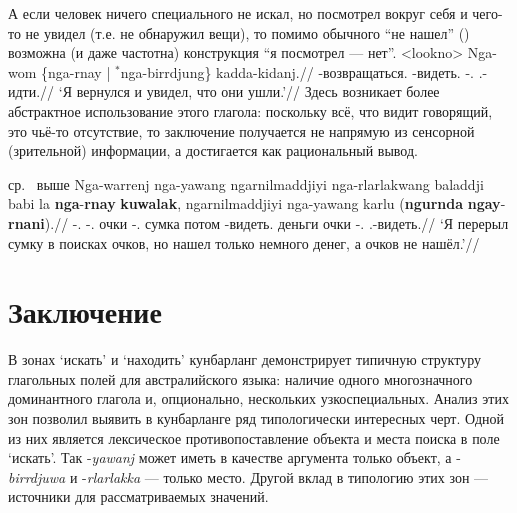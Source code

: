А если человек ничего специального не искал, но посмотрел вокруг себя и чего-то не увидел (т.е. не обнаружил вещи), то помимо обычного ``не нашел'' () возможна (и даже частотна) конструкция ``я посмотрел --- нет''. %
\ex<lookno>\begingl
\gla Nga-wom \{{nga-rnay |} $^*$nga-birrdjung\} kadda-kidanj.//
\glb \nga-возвращаться.\Pst{} \phantom{\{}\nga-видеть.\Pst{} \phantom{$^*$}\nga-\bdj.\Pst{} \Tpl.\Real-идти.\Pst{}//
\glft `Я вернулся и увидел, что они ушли.'//%
\endgl\xe
Здесь возникает более абстрактное использование этого глагола: поскольку всё, что видит говорящий, это чьё-то отсутствие, то заключение получается не напрямую из сенсорной (зрительной) информации, а достигается как рациональный вывод.


ср.\  выше
\begingl
\gla Nga-warrenj nga-yawang ngarnilmaddjiyi nga-rlarlakwang baladdji babi la \textbf{nga}-\textbf{rnay} \textbf{kuwalak}, ngarnilmaddjiyi nga-yawang karlu (\textbf{ngurnda} \textbf{ngay}-\textbf{rnani}).//
\glb \nga-\warre.\Pst{} \nga-\yaw.\Pst{} очки \nga-\rlk.\Pst{} сумка потом \la{} \nga-видеть.\Pst{} деньги очки \nga-\yaw.\Pst{} \karlu{} \phantom{(}\Neg{} \Fsg.\irrpst-видеть.\irrpst{}//
\glft `Я перерыл сумку в поисках очков, но нашел только немного денег, а очков не нашёл.'//%
\endgl\xe


\section{Заключение}
\label{sec:outro}

В зонах `искать' и `находить' кунбарланг демонстрирует типичную структуру глагольных полей для австралийского языка: наличие одного многозначного доминантного глагола и, опционально, нескольких узкоспециальных. Анализ этих зон позволил выявить в кунбарланге ряд типологически интересных черт. Одной из них является лексическое противопоставление объекта и места поиска в поле `искать'. Так -\textit{yawanj} может иметь в качестве аргумента только объект, а -\textit{birrdjuwa} и -\textit{rlarlakka} --- только место. Другой вклад в типологию этих зон --- источники для рассматриваемых значений. 



